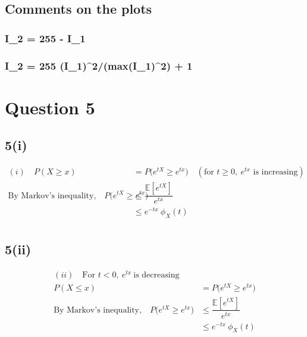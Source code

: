 \documentclass[12pt]{article}
\begin{document}
\subsection{Comments on the plots}
\subsubsection{}
\subsubsection{I_2 = 255 - I_1}
\subsubsection{I_2 = 255 \times (I_1)^2/(max(I_1)^2) + 1}
\section{Question 5}
\subsection{5(i)}
\begin{align*}
(i) \quad P(X \geq x) &= P\big(e^{tX} \geq e^{tx}\big) \quad (\text{for } t \geq 0, \ e^{tx} \text{ is increasing}) \\
\text{By Markov's inequality,} \quad 
P\big(e^{tX} \geq e^{tx}\big) &\leq \dfrac{\mathbb{E}[e^{tX}]}{e^{tx}} \\
&\leq e^{-tx} \ \phi_X(t) \\[6pt]
\end{align*}
\subsection{5(ii)}
\begin{align*}
(ii) \quad \text{For } t < 0, \ e^{tx} \ \text{is decreasing} \\
P(X \leq x) &= P\big(e^{tX} \geq e^{tx}\big) \\
\text{By Markov's inequality,} \quad 
P\big(e^{tX} \geq e^{tx}\big) &\leq \dfrac{\mathbb{E}[e^{tX}]}{e^{tx}} \\
&\leq e^{-tx} \ \phi_X(t) \\[6pt]
\end{align*}
\end{document}

